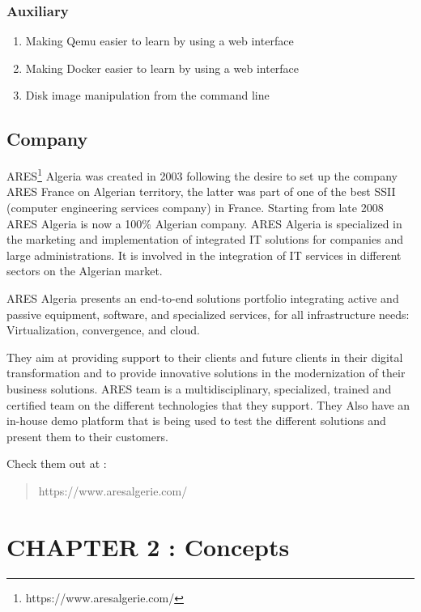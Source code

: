\documentclass[
  14pt,
  english,
  a4paper,
]{scrreprt}
\providecommand{\tightlist}{%
  \setlength{\itemsep}{0pt}\setlength{\parskip}{0pt}}
\begin{document}
\hypertarget{auxiliary}{%
\subsection{Auxiliary}\label{auxiliary}}

\begin{enumerate}
\def\labelenumi{\arabic{enumi}.}
\tightlist
\item
  Making Qemu easier to learn by using a web interface
\item
  Making Docker easier to learn by using a web interface
\item
  Disk image manipulation from the command line
\end{enumerate}

\hypertarget{company}{%
\section{Company}\label{company}}

ARES\footnote{https://www.aresalgerie.com/} Algeria was created in 2003
following the desire to set up the company ARES France on Algerian
territory, the latter was part of one of the best SSII (computer
engineering services company) in France. Starting from late 2008 ARES
Algeria is now a 100\% Algerian company. ARES Algeria is specialized in
the marketing and implementation of integrated IT solutions for
companies and large administrations. It is involved in the integration
of IT services in different sectors on the Algerian market.

ARES Algeria presents an end-to-end solutions portfolio integrating
active and passive equipment, software, and specialized services, for
all infrastructure needs: Virtualization, convergence, and cloud.

They aim at providing support to their clients and future clients in
their digital transformation and to provide innovative solutions in the
modernization of their business solutions. ARES team is a
multidisciplinary, specialized, trained and certified team on the
different technologies that they support. They Also have an in-house
demo platform that is being used to test the different solutions and
present them to their customers.

Check them out at :

\begin{quote}
https://www.aresalgerie.com/
\end{quote}

\hypertarget{chapter-2-concepts}{%
\chapter{CHAPTER 2 : Concepts}\label{chapter-2-concepts}}
\end{document}
